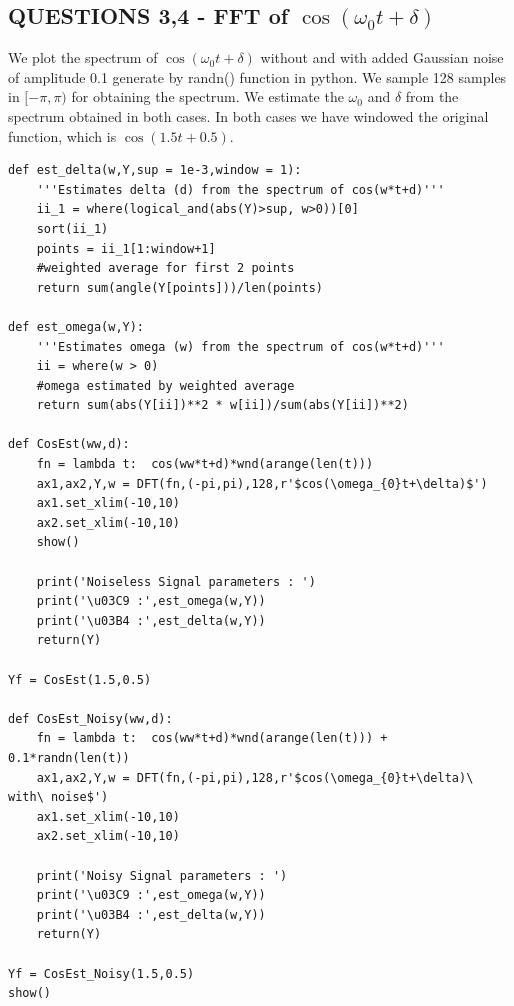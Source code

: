 \documentclass[11pt, a4paper]{article}
\begin{document}
\subsection{QUESTIONS 3,4 - FFT of $\cos(\omega_{0} t + \delta)$}
{
We plot the spectrum of $\cos(\omega_{0} t + \delta)$ without and with added Gaussian noise of amplitude 0.1 generate by randn() function in python. We sample 128 samples in $[-\pi,\pi)$ for obtaining the spectrum. We estimate the $\omega_{0}$ and $\delta$ from the spectrum obtained in both cases.
In both cases we have windowed the original function, which is $\cos(1.5 t + 0.5)$.
}
\begin{verbatim}
def est_delta(w,Y,sup = 1e-3,window = 1):
	'''Estimates delta (d) from the spectrum of cos(w*t+d)'''
	ii_1 = where(logical_and(abs(Y)>sup, w>0))[0]
	sort(ii_1)
	points = ii_1[1:window+1]
	#weighted average for first 2 points
	return sum(angle(Y[points]))/len(points)

def est_omega(w,Y):
	'''Estimates omega (w) from the spectrum of cos(w*t+d)'''
	ii = where(w > 0)
	#omega estimated by weighted average
	return sum(abs(Y[ii])**2 * w[ii])/sum(abs(Y[ii])**2)

def CosEst(ww,d):
    fn = lambda t:  cos(ww*t+d)*wnd(arange(len(t)))
    ax1,ax2,Y,w = DFT(fn,(-pi,pi),128,r'$cos(\omega_{0}t+\delta)$')
    ax1.set_xlim(-10,10)
    ax2.set_xlim(-10,10)
    show()

    print('Noiseless Signal parameters : ')
    print('\u03C9 :',est_omega(w,Y))
    print('\u03B4 :',est_delta(w,Y))
    return(Y)

Yf = CosEst(1.5,0.5)

def CosEst_Noisy(ww,d):
    fn = lambda t:  cos(ww*t+d)*wnd(arange(len(t))) + 0.1*randn(len(t))
    ax1,ax2,Y,w = DFT(fn,(-pi,pi),128,r'$cos(\omega_{0}t+\delta)\ with\ noise$')
    ax1.set_xlim(-10,10)
    ax2.set_xlim(-10,10)
    
    print('Noisy Signal parameters : ')
    print('\u03C9 :',est_omega(w,Y))
    print('\u03B4 :',est_delta(w,Y))
    return(Y)

Yf = CosEst_Noisy(1.5,0.5)
show()
\end{verbatim}
\end{document}
